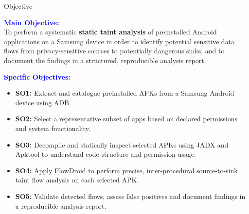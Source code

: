 \documentclass[aspectratio=169]{beamer}
\begin{document}
\begin{frame}{Objective}

\textbf{\textcolor{blue}{Main Objective:}}\\[4pt]
To perform a systematic \textbf{static taint analysis} of preinstalled Android applications
on a Samsung device in order to identify potential sensitive data flows from privacy-sensitive
sources to potentially dangerous sinks, and to document the findings in a structured,
reproducible analysis report.

\vspace{8pt}
\textbf{\textcolor{blue}{Specific Objectives:}}
\begin{itemize}
    \item \textbf{SO1:} Extract and catalogue preinstalled APKs from a Samsung Android device
          using ADB.
    \item \textbf{SO2:} Select a representative subset of apps based on declared permissions
          and system functionality.
    \item \textbf{SO3:} Decompile and statically inspect selected APKs using JADX and Apktool
          to understand code structure and permission usage.
    \item \textbf{SO4:} Apply FlowDroid to perform precise, inter-procedural source-to-sink
          taint flow analysis on each selected APK.
    \item \textbf{SO5:} Validate detected flows, assess false positives and document findings
          in a reproducible analysis report.
\end{itemize}
\end{frame}
\end{document}
